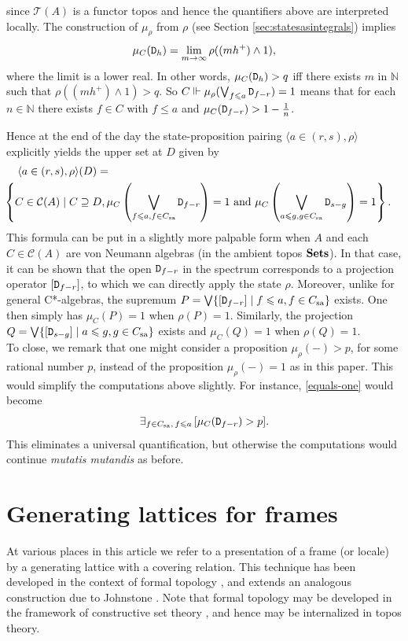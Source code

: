 \documentclass[11pt]{article}
\newcommand{\Sets}{\mbox{\textbf{Sets}}}
\newcommand{\ca}{C*-algebra} \newcommand{\jba}{JB-algebra}
\newcommand{\rh}{\rho} \newcommand{\sg}{\sigma}
\newcommand{\CA}{{\mathcal A}} \newcommand{\CB}{{\mathcal B}}
\newcommand{\alg}[1]{\ensuremath{#1}}
\newcommand{\context}{\ensuremath{\mathcal{C}}}
\newcommand{\asstopos}{\ensuremath{\mathcal{T}}}
\newcommand{\sa}{\ensuremath{_{\mathrm{sa}}}}
\newcommand{\prop}[1]{\ensuremath{\mbox{\texttt{#1}}}}
\newcommand{\field}[1]{\ensuremath{\mathbb{#1}}}
\renewcommand{\CA}{\mathcal{C}(A)}
\newcommand{\TA}{\mathcal{T}(A)}
\renewcommand{\TA}{\asstopos(\alg{A})}
\renewcommand{\CA}{\context(\alg{A})}
\begin{document}
  since $\TA$ is a functor topos and hence the quantifiers
above are interpreted locally.
The construction of $\mu_{\rh}$ from $\rh$ (see Section \ref{sec:statesasintegrals}) implies
$$\mu_C(\prop{D}_h) = \lim_{m \to \infty} \rho((mh^+)\wedge 1),$$
where the limit is a lower real. In other words, $\mu_C(\prop{D}_h)>q$ iff
there exists $m$ in $\field{N}$ such that $\rho((mh^+) \wedge 1) > q$.
So $C \Vdash \mu_{\rho}(\bigvee_{f \leqslant
a}\prop{D}_{f-r})=1$ means that
for each $n \in \field{N}$ there exists $f \in C$ with $f \leqslant a$ and
$\mu_C(\prop{D}_{f-r})>1-\frac{1}{n}$.

Hence at the end of the day the
state-proposition pairing $\langle a \in (r,s), \rho \rangle$
explicitly yields the upper set at $D$ given by
\begin{eqnarray}\label{eq:51}
\lefteqn{ \langle a \in (r,s), \rho \rangle(D) =}  \\ & &
\hspace*{-0.75cm}
\left\{C \in \CA \mid C\supseteq D,
      \mu_C  \left(\bigvee_{f\leqslant a, f\in C\sa} \prop{D}_{f-r}\right)=1 \mbox{ and }
      \mu_C  \left(\bigvee_{a\leqslant g, g\in C\sa} \prop{D}_{s-g}\right)=1 \right\}.\nonumber
\end{eqnarray}
This formula can be put in a slightly more palpable form when
$A$ and each $C\in\CA$ are von Neumann algebras (in
the ambient topos $\Sets$). In that case, it can be shown \cite{HLSSyn} that the open $\prop{D}_{f-r}$ in the spectrum
corresponds to a projection operator $[\prop{D}_{f-r}]$, to which we can directly apply the state $\rh$. Moreover, unlike for general \ca s,
 the supremum $P=\bigvee \{[\prop{D}_{f-r}] \mid f\leqslant a, f\in C\sa  \}$
  exists. One then simply has $\mu_C(P)=1$
when $\rho(P)=1$. Similarly, the projection
$Q=\bigvee \{[\prop{D}_{s-g}] \mid a\leqslant g, g\in C\sa  \}$ exists and
 $\mu_C(Q)=1$
when $\rho(Q)=1$.\\

To close, we remark that one might  consider a proposition $\mu_{\rho}(-)>p$, for some rational
number
$p$, instead of the proposition $\mu_{\rho}(-)=1$ as in this paper. This would simplify the
computations above slightly. For instance, \eqref{equals-one} would become
\[
 \exists_{f\in C\sa,\,  f \leqslant
  a}\, [ \mu_C(\prop{D}_{f-r}) > p].
\]
This eliminates a universal quantification, but otherwise the computations
would continue \emph{mutatis mutandis} as before.
\appendix
\section{Generating lattices for frames}
\label{AppA}
At various places in this article we refer to a presentation
of a frame (or locale) by a generating lattice with a covering
relation. This technique has been developed in the context of formal topology \cite{Sambin87, sambin}, and extends an
analogous construction due to Johnstone \cite{johnstone82}. Note that
formal topology may be developed in the framework of constructive set theory
\cite{aczel}, and hence may be internalized in topos theory.
\end{document}
